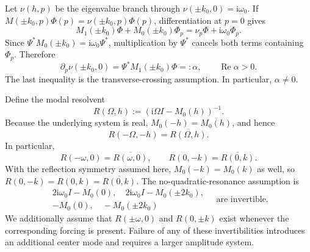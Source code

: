 \documentclass[11pt]{article}
\newcommand{\ii}{\mathrm{i}}
\DeclareMathOperator{\RePart}{Re}
\begin{document}
Let $\nu(h,p)$ be the eigenvalue branch through
$\nu(\pm k_0,0)=\ii\omega_0$.  If
$M(\pm k_0,p)\Phi(p)=\nu(\pm k_0,p)\Phi(p)$, differentiation at $p=0$
gives
\begin{equation}
 M_1(\pm k_0)\Phi+M_0(\pm k_0)\Phi_p
 =\nu_p\Phi+\ii\omega_0\Phi_p.
 \label{eq:eigenvalue-differentiation}
\end{equation}
Since $\Psi^*M_0(\pm k_0)=\ii\omega_0\Psi^*$, multiplication by $\Psi^*$
cancels both terms containing $\Phi_p$.  Therefore
\begin{equation}
 \partial_p\nu(\pm k_0,0)
 =\Psi^*M_1(\pm k_0)\Phi=: \alpha,
 \qquad \RePart\alpha>0.
 \label{eq:transversality}
\end{equation}
The last inequality is the transverse-crossing assumption.  In particular,
$\alpha\ne0$.

Define the modal resolvent
\begin{equation}
 R(\Omega,h):=\left(\ii\Omega I-M_0(h)\right)^{-1}.
 \label{eq:resolvent}
\end{equation}
Because the underlying system is real,
$M_0(-h)=\overline{M_0(h)}$, and hence
\begin{equation}
 R(-\Omega,-h)=\overline{R(\Omega,h)}.
 \label{eq:resolvent-conjugacy}
\end{equation}
In particular,
\begin{equation}
 R(-\omega,0)=\overline{R(\omega,0)},
 \qquad
 R(0,-k)=\overline{R(0,k)}.
 \label{eq:forcing-resolvent-conjugacy}
\end{equation}
With the reflection symmetry assumed here, $M_0(-k)=M_0(k)$ as well, so
$R(0,-k)=R(0,k)=\overline{R(0,k)}$.
The no-quadratic-resonance assumption is
\begin{equation}
 \begin{gathered}
 2\ii\omega_0I-M_0(0),\quad
 2\ii\omega_0I-M_0(\pm2k_0),\\
 -M_0(0),\quad -M_0(\pm2k_0)
 \end{gathered}
 \quad\text{are invertible.}
 \label{eq:no-quadratic-resonance}
\end{equation}
We additionally assume that $R(\pm\omega,0)$ and $R(0,\pm k)$ exist whenever
the corresponding forcing is present.  Failure of any of these
invertibilities introduces an additional center mode and requires a larger
amplitude system.
\end{document}
